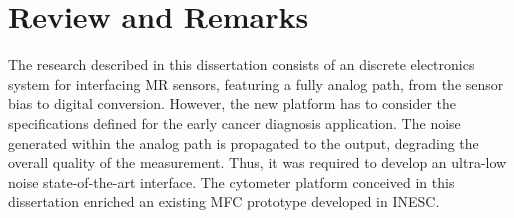
\label{chapter:conclusion}

\clearpage

\section{Review and Remarks}
\label{section:conclusion-conclusion}

The research described in this dissertation consists of an discrete electronics system for interfacing \ac{MR} sensors, featuring a fully analog path, from the sensor bias to digital conversion. However, the new platform has to consider the specifications defined for the early cancer diagnosis application. The noise generated within the analog path is propagated to the output, degrading the overall quality of the measurement. Thus, it was required to develop an ultra-low noise state-of-the-art interface. The cytometer platform conceived in this dissertation enriched an existing \ac{MFC} prototype developed in \ac{INESC}.

